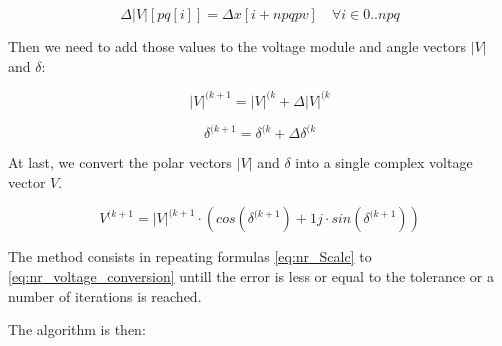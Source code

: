 \documentclass{tufte-book}
\begin{document}
\begin{equation}
\Delta  |V|[pq[i]] = \Delta x[i+npqpv]  \quad \forall i \in {0..npq}
\end{equation}

Then we need to add those values to the voltage module and angle vectors $|V|$ and $\delta$:


\begin{equation}
|V|^{(k+1} = |V|^{(k} + \Delta |V|^{(k}
\end{equation}

\begin{equation}
\delta^{(k+1} = \delta^{(k} + \Delta \delta^{(k}
\end{equation}

At last, we convert the polar vectors  $|V|$ and $\delta$ into a single complex voltage vector $V$.

\begin{equation}
V^{(k+1} = |V|^{(k+1} \cdot \left( cos(\delta^{(k+1}) + 1j \cdot sin(\delta^{(k+1})\right)
\label{eq:nr_voltage_conversion}
\end{equation}

The method consists in repeating formulas \ref{eq:nr_Scalc} to \ref{eq:nr_voltage_conversion} untill the error is less or equal to the tolerance or a number of iterations is reached.

The algorithm is then:
\end{document}
